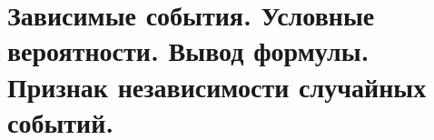 \documentclass[polytech/stats/exam-2023/stats-exam-2023.tex]{subfiles}
\begin{document}
\section{Зависимые события. Условные вероятности. Вывод формулы. Признак независимости случайных событий.}
\end{document}

